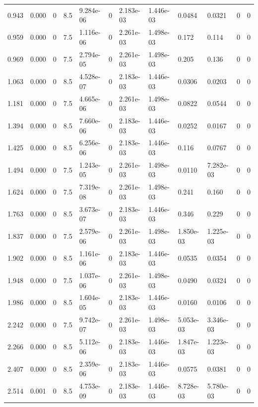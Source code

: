 \documentclass[preview]{standalone}
\begin{document}
{{\begin{tabular}{L{1.2cm}C{1.2cm} C{0.3cm}C{0.5cm} C{1.4cm}C{1.4cm} C{1.4cm}C{1.4cm} C{1.6cm}C{1.6cm} C{1.6cm}C{1.6cm}}
  0.943  &  0.000  & 0     & 8.5 &  9.284e-06  & 0  &  2.183e-03&   1.446e-03& 0.0484 & 0.0321   &  0 & 0  \\ 
  0.959  &  0.000  & 0     & 7.5 &  1.116e-06  & 0  &  2.261e-03&   1.498e-03& 0.172 & 0.114   &  0 & 0  \\ 
  0.969  &  0.000  & 0     & 7.5 &  2.794e-05  & 0  &  2.261e-03&   1.498e-03& 0.205 & 0.136   &  0 & 0  \\ 
  1.063  &  0.000  & 0     & 8.5 &  4.528e-07  & 0  &  2.183e-03&   1.446e-03& 0.0306 & 0.0203   &  0 & 0  \\ 
  1.181  &  0.000  & 0     & 7.5 &  4.665e-06  & 0  &  2.261e-03&   1.498e-03& 0.0822 & 0.0544   &  0 & 0  \\ 
  1.394  &  0.000  & 0     & 8.5 &  7.660e-06  & 0  &  2.183e-03&   1.446e-03& 0.0252 & 0.0167   &  0 & 0  \\ 
  1.425  &  0.000  & 0     & 8.5 &  6.256e-06  & 0  &  2.183e-03&   1.446e-03& 0.116 & 0.0767   &  0 & 0  \\ 
  1.494  &  0.000  & 0     & 7.5 &  1.243e-05  & 0  &  2.261e-03&   1.498e-03& 0.0110 & 7.282e-03   &  0 & 0  \\ 
  1.624  &  0.000  & 0     & 7.5 &  7.319e-08  & 0  &  2.261e-03&   1.498e-03& 0.241 & 0.160   &  0 & 0  \\ 
  1.763  &  0.000  & 0     & 8.5 &  3.673e-07  & 0  &  2.183e-03&   1.446e-03& 0.346 & 0.229   &  0 & 0  \\ 
  1.837  &  0.000  & 0     & 7.5 &  2.579e-06  & 0  &  2.261e-03&   1.498e-03& 1.850e-03 & 1.225e-03   &  0 & 0  \\ 
  1.902  &  0.000  & 0     & 8.5 &  1.161e-06  & 0  &  2.183e-03&   1.446e-03& 0.0535 & 0.0354   &  0 & 0  \\ 
  1.948  &  0.000  & 0     & 7.5 &  1.037e-06  & 0  &  2.261e-03&   1.498e-03& 0.0490 & 0.0324   &  0 & 0  \\ 
  1.986  &  0.000  & 0     & 8.5 &  1.604e-05  & 0  &  2.183e-03&   1.446e-03& 0.0160 & 0.0106   &  0 & 0  \\ 
  2.242  &  0.000  & 0     & 7.5 &  9.742e-07  & 0  &  2.261e-03&   1.498e-03& 5.053e-03 & 3.346e-03   &  0 & 0  \\ 
  2.266  &  0.000  & 0     & 8.5 &  5.112e-06  & 0  &  2.183e-03&   1.446e-03& 1.847e-03 & 1.223e-03   &  0 & 0  \\ 
  2.407  &  0.000  & 0     & 8.5 &  2.359e-06  & 0  &  2.183e-03&   1.446e-03& 0.0575 & 0.0381   &  0 & 0  \\ 
  2.514  &  0.001  & 0     & 8.5 &  4.753e-09  & 0  &  2.183e-03&   1.446e-03& 8.728e-03 & 5.780e-03   &  0 & 0  \\ 

\end{tabular}}}
\end{document}
